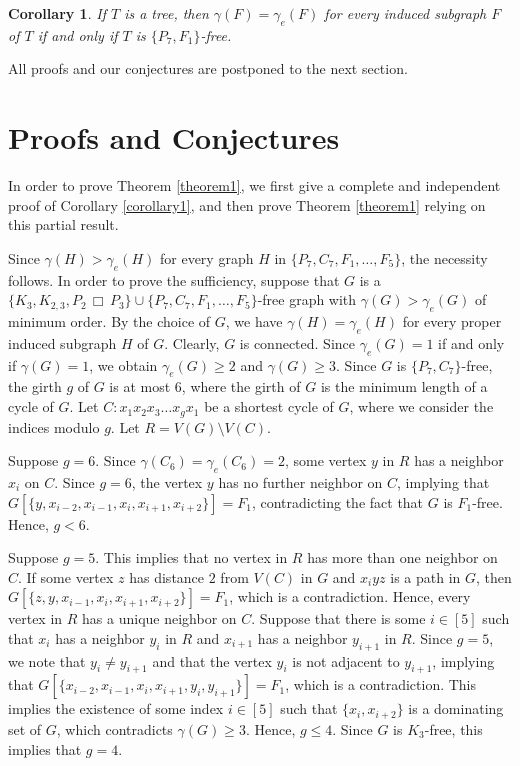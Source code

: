 \documentclass[12pt]{article}
\newtheorem{corollary}[theorem]{Corollary}
\newcommand{\cart}{\, \Box \,}
\begin{document}
\begin{corollary}\label{corollary2}
If $T$ is a tree, 
then $\gamma(F) = \gamma_e(F)$ for every induced subgraph $F$ of $T$
if and only if $T$ is $\{ P_7,F_1\}$-free.
\end{corollary}
All proofs and our conjectures are postponed to the next section.

\section{Proofs and Conjectures}

In order to prove Theorem \ref{theorem1}, 
we first give a complete and independent proof of Corollary \ref{corollary1},
and then prove Theorem \ref{theorem1} relying on this partial result.

\medskip

Since $\gamma(H)>\gamma_e(H)$ for every graph $H$ in $\{ P_7, C_7, F_1,\dots, F_5\}$,
the necessity follows. In order to prove the sufficiency, suppose that $G$ is a
$\{ K_3,K_{2,3},P_2 \cart P_3\}\cup\{ P_7, C_7, F_1,\dots, F_5\}$-free graph
with $\gamma(G)>\gamma_e(G)$ of minimum order.
By the choice of $G$, we have $\gamma(H) = \gamma_e(H)$ for every proper induced subgraph $H$ of $G$.
Clearly, $G$ is connected.
Since $\gamma_e(G)=1$ if and only if $\gamma(G)=1$,
we obtain $\gamma_e(G)\geq 2$ and $\gamma(G)\geq 3$.
Since $G$ is $\{ P_7,C_7\}$-free, the girth $g$ of $G$ is at most $6$,
where the girth of $G$ is the minimum length of a cycle of $G$.
Let $C:x_1x_2x_3\ldots x_gx_1$ be a shortest cycle of $G$,
where we consider the indices modulo $g$.
Let $R=V(G)\setminus V(C)$.

Suppose $g=6$.
Since $\gamma(C_6)=\gamma_e(C_6)=2$, some vertex $y$ in $R$ has a neighbor $x_i$ on $C$.
Since $g=6$, the vertex $y$ has no further neighbor on $C$, implying that $G[\{ y,x_{i-2},x_{i-1},x_i,x_{i+1},x_{i+2}\}] = F_1$, contradicting the fact that $G$ is $F_1$-free.
Hence, $g<6$.

Suppose $g=5$.
This implies that no vertex in $R$ has more than one neighbor on $C$.
If some vertex $z$ has distance $2$ from $V(C)$ in $G$ and $x_iyz$ is a path in $G$,
then $G[\{ z,y,x_{i-1},x_i,x_{i+1},x_{i+2}\}]=F_1$, which is a contradiction.
Hence, every vertex in $R$ has a unique neighbor on $C$. Suppose that there is some $i\in [5]$ such that
$x_i$ has a neighbor $y_i$ in $R$
and
$x_{i+1}$ has a neighbor $y_{i+1}$ in $R$. Since $g = 5$, we note that $y_i \ne y_{i+1}$ and that the vertex $y_i$ is not adjacent to $y_{i+1}$, implying that $G[\{ x_{i-2},x_{i-1},x_i,x_{i+1},y_i,y_{i+1}\}]=F_1$, which is a contradiction.
This implies the existence of some index $i\in [5]$ such that $\{ x_i,x_{i+2}\}$ is a dominating set of $G$,
which contradicts $\gamma(G) \geq 3$. Hence, $g \le 4$. Since $G$ is $K_3$-free, this implies that $g=4$.
\end{document}
